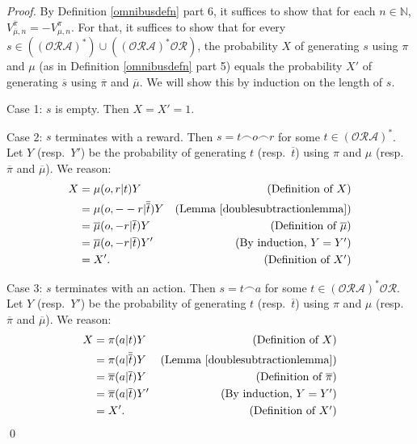 \documentclass[runningheads]{llncs}
\begin{document}
\begin{proof}
    By Definition \ref{omnibusdefn} part 6,
    it suffices to show that for each $n\in\mathbb N$,
    $V^{\overline \pi}_{\overline \mu,n}=-V^\pi_{\mu,n}$.
    For that, it suffices to show that for every
    $s\in ((\mathcal O\mathcal R\mathcal A)^*)
    \cup ((\mathcal O\mathcal R\mathcal A)^*\mathcal O\mathcal R)$,
    the probability $X$ of generating $s$ using $\pi$ and $\mu$
    (as in Definition \ref{omnibusdefn} part 5)
    equals the probability $X'$ of generating $\overline s$
    using $\overline \pi$ and $\overline \mu$.
    We will show this by induction on the length of $s$.

    Case 1: $s$ is empty. Then $X=X'=1$.

    Case 2: $s$ terminates with a reward.
    Then $s=t\frown o \frown r$
    for some $t\in (\mathcal O\mathcal R\mathcal A)^*$.
    Let $Y$ (resp.\ $Y'$) be the probability of generating $t$
    (resp.\ $\overline t$)
    using $\pi$ and $\mu$ (resp.\ $\overline \pi$ and $\overline \mu$). We reason:
    \begin{align*}
        X &= \mu(o,r|t)Y
            &\mbox{(Definition of $X$)}\\
          &= \mu(o,--r| \overline{\overline t})Y
            &\mbox{(Lemma \ref{doublesubtractionlemma})}\\
          &= \overline \mu(o,-r| \overline t)Y
            &\mbox{(Definition of $\overline\mu$)}\\
          &= \overline \mu(o,-r| \overline t)Y'
            &\mbox{(By induction, $Y=Y'$)}\\
          &= X'. &\mbox{(Definition of $X'$)}
    \end{align*}

    Case 3: $s$ terminates with an action.
    Then $s=t\frown a$ for some $t\in(\mathcal O\mathcal R\mathcal A)^*\mathcal O\mathcal R$.
    Let $Y$ (resp.\ $Y'$) be the probability of generating $t$
    (resp.\ $\overline t$)
    using $\pi$ and $\mu$ (resp.\ $\overline\pi$ and $\overline\mu$). We reason:
    \begin{align*}
        X &= \pi(a|t)Y
            &\mbox{(Definition of $X$)}\\
          &= \pi(a|\overline{\overline t})Y
            &\mbox{(Lemma \ref{doublesubtractionlemma})}\\
          &= \overline \pi(a|\overline t)Y
            &\mbox{(Definition of $\overline \pi$)}\\
          &= \overline \pi(a|\overline t)Y'
            &\mbox{(By induction, $Y=Y'$)}\\
          &= X'. &\mbox{(Definition of $X'$)}
    \end{align*}
    \qed
\end{proof}
\end{document}
